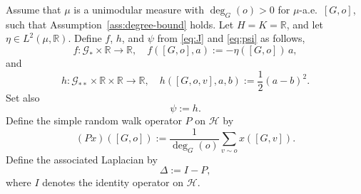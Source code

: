 \documentclass[11pt]{article}
\newcommand{\R}{{\mathbb R}}
\numberwithin{equation}{section}
\begin{document}
Assume that $\mu$ is a unimodular measure with \(\deg_G(o)>0\) for \(\mu\)-a.e.~$[G,o]$, such that Assumption~\ref{ass:degree-bound} holds. Let \(H=K=\mathbb R\), and let \(\eta\in L^2(\mu,\R)\). Define $f$, $h$, and $\psi$ from \eqref{eq:J} and \eqref{eq:psi} as follows, 
\begin{equation}\label{eq:lq-f}
f:\mathcal{G}_\ast\times\R\to\R,\quad f([G,o],a):=-\eta([G,o])\,a,
\end{equation}
and
\begin{equation}\label{eq:lq-h}
h:\mathcal{G}_{\ast\ast}\times\R\times\R\to\R,\quad h([G,o,v],a,b):=\frac12(a-b)^2.
\end{equation}
Set also
\begin{equation}\label{eq:lq-psi}
\psi:=h.
\end{equation}
Define the simple random walk operator $P$ on $\mathcal H$ by
\begin{equation}\label{eq:lq-P}
(Px)([G,o])
:=
\frac{1}{\deg_G(o)}\sum_{v\sim o}x([G,v]).
\end{equation}
Define the associated Laplacian by
\begin{equation}\label{eq:lq-Delta}
\Delta:=I-P,
\end{equation}
where \(I\) denotes the identity operator on \(\mathcal H\). 
\end{document}
